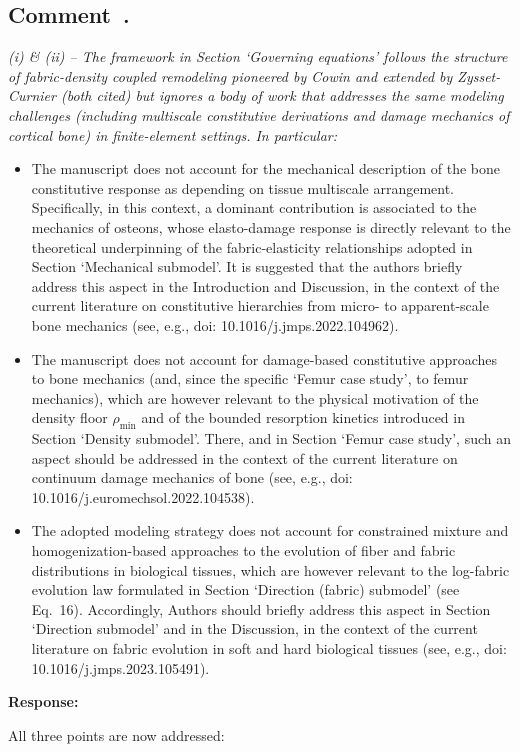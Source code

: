 \documentclass[11pt,a4paper]{article}
\newcounter{reviewer}
\newcounter{comment}[reviewer]
\newcommand{\revcomment}[1]{%
  \refstepcounter{comment}%
  \subsection*{Comment~\thereviewer.\thecomment}%
  {\color{reviewerblue}\itshape #1}%
  \medskip
}
\newcommand{\response}{%
  \par\noindent\textbf{Response:}\par\noindent\color{responseblack}%
}
\begin{document}
\revcomment{(i) \& (ii) -- The framework in Section `Governing equations' follows the structure of fabric-density coupled remodeling pioneered by Cowin and extended by Zysset-Curnier (both cited) but ignores a body of work that addresses the same modeling challenges (including multiscale constitutive derivations and damage mechanics of cortical bone) in finite-element settings. In particular:
\begin{itemize}[nosep]
\item The manuscript does not account for the mechanical description of the bone constitutive response as depending on tissue multiscale arrangement. Specifically, in this context, a dominant contribution is associated to the mechanics of osteons, whose elasto-damage response is directly relevant to the theoretical underpinning of the fabric-elasticity relationships adopted in Section `Mechanical submodel'. It is suggested that the authors briefly address this aspect in the Introduction and Discussion, in the context of the current literature on constitutive hierarchies from micro- to apparent-scale bone mechanics (see, e.g., doi: 10.1016/j.jmps.2022.104962).
\item The manuscript does not account for damage-based constitutive approaches to bone mechanics (and, since the specific `Femur case study', to femur mechanics), which are however relevant to the physical motivation of the density floor $\rho_{\min}$ and of the bounded resorption kinetics introduced in Section `Density submodel'. There, and in Section `Femur case study', such an aspect should be addressed in the context of the current literature on continuum damage mechanics of bone (see, e.g., doi: 10.1016/j.euromechsol.2022.104538).
\item The adopted modeling strategy does not account for constrained mixture and homogenization-based approaches to the evolution of fiber and fabric distributions in biological tissues, which are however relevant to the log-fabric evolution law formulated in Section `Direction (fabric) submodel' (see Eq.~16). Accordingly, Authors should briefly address this aspect in Section `Direction submodel' and in the Discussion, in the context of the current literature on fabric evolution in soft and hard biological tissues (see, e.g., doi: 10.1016/j.jmps.2023.105491).
\end{itemize}}

\response
All three points are now addressed:
\end{document}
